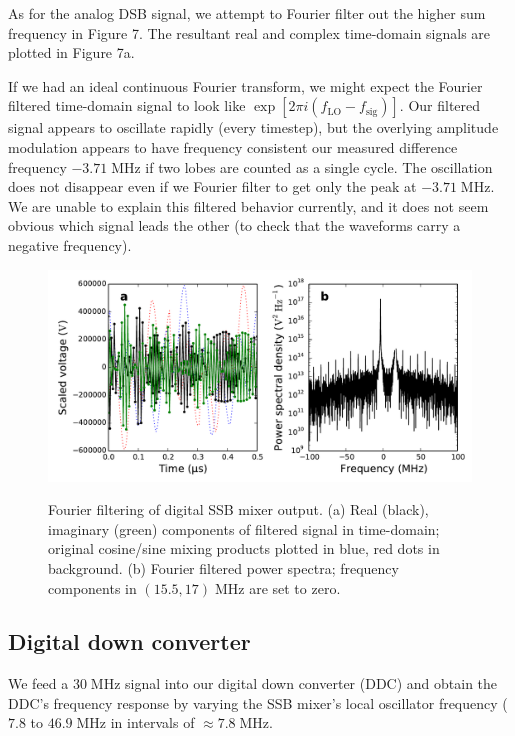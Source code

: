 \documentclass[11pt]{article}
\newcommand {\mt}{\mathrm}
\newcommand {\unit}[1]{\; \mt{#1}}
\begin{document}
As for the analog DSB signal, we attempt to Fourier filter out the higher sum
frequency in Figure 7.  The resultant real and complex time-domain signals are
plotted in Figure 7a.

If we had an ideal continuous Fourier transform, we might expect the
Fourier filtered time-domain signal to look like
$\exp\left[ 2\pi i \left( f_{\mt{LO}} - f_{\mt{sig}} \right) \right]$.
Our filtered signal appears to oscillate rapidly (every timestep), but the
overlying amplitude modulation appears to have frequency consistent our
measured difference frequency $-3.71 \unit{MHz}$ if two lobes are counted as a
single cycle.  The oscillation does not disappear even if we Fourier filter to
get only the peak at $-3.71 \unit{MHz}$.  We are unable to explain this
filtered behavior currently, and it does not seem obvious which signal leads
the other (to check that the waveforms carry a negative frequency).

\begin{figure}[!htb]
  \centering
  \includegraphics[scale=0.5]{scripts/digital_mixing_SSB_filtered.pdf}\\
  \caption{Fourier filtering of digital SSB mixer output. (a) Real (black),
  imaginary (green) components of filtered signal in time-domain; original
  cosine/sine mixing products plotted in blue, red dots in background.
  (b) Fourier filtered power spectra; frequency components in $(15.5, 17)
  \unit{MHz}$ are set to zero.}
\end{figure}

\subsection{Digital down converter}

We feed a $30 \unit{MHz}$ signal into our digital down converter (DDC) and
obtain the DDC's frequency response by varying the SSB mixer's local oscillator
frequency ($7.8$ to $46.9 \unit{MHz}$ in intervals of $\approx 7.8 \unit{MHz}$.
\end{document}
